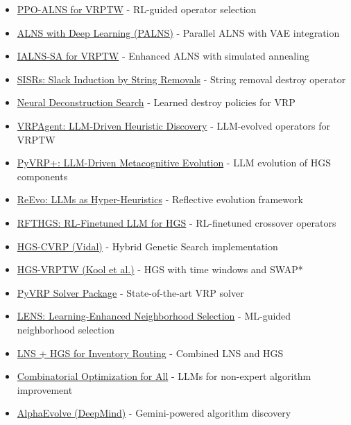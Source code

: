 \documentclass[twocolumn,10pt,letterpaper]{article}
\begin{document}
\begin{itemize}
\setlength{\itemsep}{0pt}
\setlength{\parskip}{0pt}
  \item \href{https://link.springer.com/article/10.1007/s10878-025-01364-6}{PPO-ALNS for VRPTW} - RL-guided operator selection
  \item \href{https://link.springer.com/article/10.1007/s12065-025-01115-w}{ALNS with Deep Learning (PALNS)} - Parallel ALNS with VAE integration
  \item \href{https://www.mdpi.com/2079-9292/14/12/2375}{IALNS-SA for VRPTW} - Enhanced ALNS with simulated annealing
  \item \href{https://pubsonline.informs.org/doi/10.1287/trsc.2019.0914}{SISRs: Slack Induction by String Removals} - String removal destroy operator
  \item \href{https://arxiv.org/abs/2501.03715}{Neural Deconstruction Search} - Learned destroy policies for VRP
  \item \href{https://arxiv.org/abs/2510.07073}{VRPAgent: LLM-Driven Heuristic Discovery} - LLM-evolved operators for VRPTW
  \item \href{https://arxiv.org/abs/2604.07872}{PyVRP+: LLM-Driven Metacognitive Evolution} - LLM evolution of HGS components
  \item \href{https://arxiv.org/abs/2402.01145}{ReEvo: LLMs as Hyper-Heuristics} - Reflective evolution framework
  \item \href{https://arxiv.org/abs/2510.11121}{RFTHGS: RL-Finetuned LLM for HGS} - RL-finetuned crossover operators
  \item \href{https://github.com/vidalt/HGS-CVRP}{HGS-CVRP (Vidal)} - Hybrid Genetic Search implementation
  \item \href{https://wouterkool.github.io/publication/hgs-vrptw/}{HGS-VRPTW (Kool et al.)} - HGS with time windows and SWAP*
  \item \href{https://arxiv.org/abs/2403.13795}{PyVRP Solver Package} - State-of-the-art VRP solver
  \item \href{https://arxiv.org/abs/2403.08839}{LENS: Learning-Enhanced Neighborhood Selection} - ML-guided neighborhood selection
  \item \href{https://arxiv.org/abs/2506.03172}{LNS + HGS for Inventory Routing} - Combined LNS and HGS
  \item \href{https://arxiv.org/abs/2503.10968}{Combinatorial Optimization for All} - LLMs for non-expert algorithm improvement
  \item \href{https://arxiv.org/abs/2506.13131}{AlphaEvolve (DeepMind)} - Gemini-powered algorithm discovery

\end{itemize}
\end{document}
